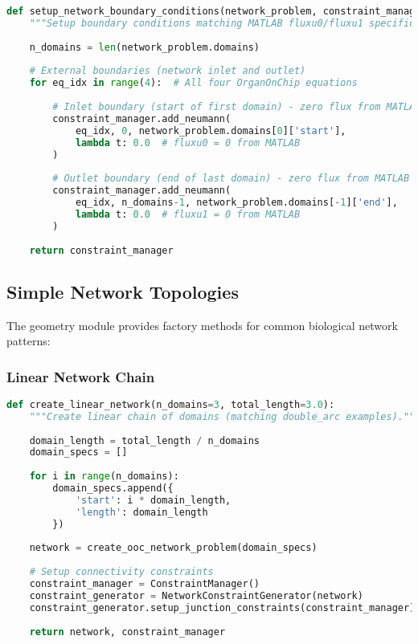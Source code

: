 \begin{lstlisting}[language=Python, caption=Network Boundary Conditions]
def setup_network_boundary_conditions(network_problem, constraint_manager):
    """Setup boundary conditions matching MATLAB fluxu0/fluxu1 specification."""
    
    n_domains = len(network_problem.domains)
    
    # External boundaries (network inlet and outlet)
    for eq_idx in range(4):  # All four OrganOnChip equations
        
        # Inlet boundary (start of first domain) - zero flux from MATLAB
        constraint_manager.add_neumann(
            eq_idx, 0, network_problem.domains[0]['start'],
            lambda t: 0.0  # fluxu0 = 0 from MATLAB
        )
        
        # Outlet boundary (end of last domain) - zero flux from MATLAB  
        constraint_manager.add_neumann(
            eq_idx, n_domains-1, network_problem.domains[-1]['end'],
            lambda t: 0.0  # fluxu1 = 0 from MATLAB
        )
    
    return constraint_manager
\end{lstlisting}

\subsection{Simple Network Topologies}
\label{subsec:simple_topologies}

The geometry module provides factory methods for common biological network patterns:

\subsubsection{Linear Network Chain}

\begin{lstlisting}[language=Python, caption=Linear Domain Chain]
def create_linear_network(n_domains=3, total_length=3.0):
    """Create linear chain of domains (matching double_arc examples)."""
    
    domain_length = total_length / n_domains
    domain_specs = []
    
    for i in range(n_domains):
        domain_specs.append({
            'start': i * domain_length,
            'length': domain_length
        })
    
    network = create_ooc_network_problem(domain_specs)
    
    # Setup connectivity constraints
    constraint_manager = ConstraintManager()
    constraint_generator = NetworkConstraintGenerator(network)
    constraint_generator.setup_junction_constraints(constraint_manager)
    
    return network, constraint_manager
\end{lstlisting}

